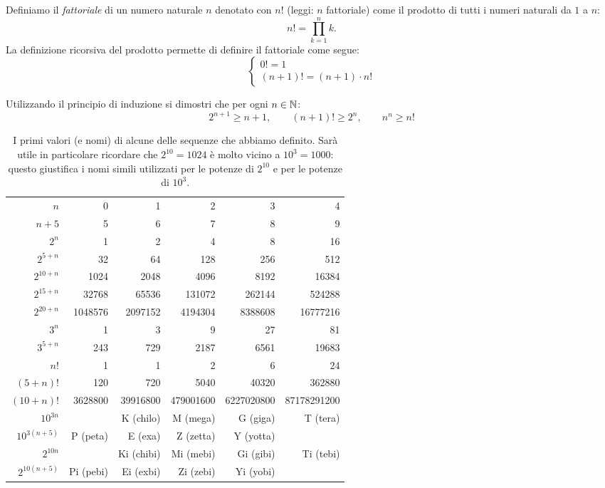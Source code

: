 Definiamo il 
\emph{fattoriale}%
%
%
%
di un numero naturale $n$
denotato con $n!$ (leggi: $n$ fattoriale) 
come il prodotto di tutti i numeri naturali da $1$ a $n$:
\[
  n! = \prod_{k=1}^n k.
\]
La definizione ricorsiva del prodotto permette di definire il fattoriale
come segue:
\[
  \begin{cases}
    0! = 1 \\
    (n+1)! = (n+1) \cdot n!
  \end{cases}
\]

\begin{exercise}
  \label{ex:6734098}%
  Utilizzando il principio di induzione
  si dimostri che per ogni $n\in {\mathbb N}$:
  \[
    2^{n+1} \ge n+1, \qquad
    (n+1)! \ge 2^n, \qquad
    n^n \ge n!
  \]
\end{exercise}

\begin{table}
  \begin{center}
  \begin{tabular}{r|>{\small}r>{\small}r>{\small}r>{\small}r>{\small}r}
  $n$       & 0 & 1 & 2 & 3 & 4 \\
  \footnotesize $n+5$     & 5 & 6 & 7 & 8 & 9 \\ \hline
  $2^n$     & 1 & 2 & 4 & 8 & 16 \\
  \footnotesize $2^{5+n}$ & 32 & 64 & 128 & 256 & 512 \\
  \footnotesize $2^{10+n}$ & 1024 & 2048 & 4096 & 8192 & 16384 \\
  \footnotesize $2^{15+n}$ & 32768 & 65536 & 131072 & 262144 & 524288 \\
  \footnotesize $2^{20+n}$ & 1048576 & 2097152 & 4194304 & 8388608 & 16777216 \\  \hline
  $3^n$                    & 1 & 3 & 9 & 27 & 81 \\
  \footnotesize $3^{5+n}$  & 243 & 729 & 2187 & 6561 & 19683 \\  \hline
  $n!$      & 1 & 1 & 2 & 6 & 24 \\
  \footnotesize $(5+n)!$  & 120 & 720 & 5040 & 40320 & 362880 \\
  \footnotesize $(10+n)!$  & 3628800 & 39916800 & 479001600 & 6227020800 & 87178291200 \\ \hline
  \footnotesize $10^{3n}$  &  & K (chilo) & M (mega) & G (giga) & T (tera) \\ 
  \footnotesize $10^{3(n+5)}$  & P (peta) & E (exa) & Z (zetta) & Y (yotta) \\ \hline
  \footnotesize $2^{10n}$  &  & Ki (chibi) & Mi (mebi) & Gi (gibi) & Ti (tebi) \\
  \footnotesize $2^{10(n+5)}$ & Pi (pebi)& Ei (exbi) & Zi (zebi) & Yi (yobi)
  \end{tabular}
  \end{center}
  \caption{I primi valori (e nomi) di alcune delle sequenze che abbiamo definito.
  Sarà utile in particolare ricordare che  $2^{10}=1024$ 
  è molto vicino a $10^3=1000$: questo giustifica i nomi simili utilizzati
  per le potenze di $2^{10}$ e per le potenze di $10^3$.
  }
  \end{table}
  
